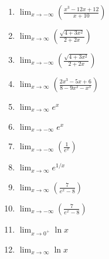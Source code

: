 \documentclass[12pt]{article}
\newif\ifans
\begin{document}
\begin{enumerate}
\item  $\displaystyle \lim_{x\rightarrow -\infty}{\left(\frac{x^3-12x+12}{x+10}\right)}$

\ifans{\fbox{$+\infty$}} \fi

\item $\displaystyle \lim_{x \rightarrow \infty}{\left(\frac{\sqrt{4+3x^2}}{2+2x}\right)}$

\ifans{\fbox{$\displaystyle \frac{\sqrt{3}}{2}$}} \fi

\item $\displaystyle \lim_{x \rightarrow -\infty}{\left(\frac{\sqrt{4+3x^2}}{2+2x}\right)}$

\ifans{\fbox{$\displaystyle -\frac{\sqrt{3}}{2}$}} \fi

\item $\displaystyle \lim_{x \rightarrow \infty}{\left(\frac{2x^3-5x+6}{8-9x^2-x^3}\right)}$

\ifans{\fbox{$-2$}} \fi

\item  $\displaystyle \lim_{x\rightarrow \infty}{e^{x}}$ 

\ifans{\fbox{$+\infty$}} \fi

\item  $\displaystyle \lim_{x\rightarrow -\infty}{e^x}$ 

\ifans{\fbox{0}} \fi

\item  $\displaystyle \lim_{x\rightarrow -\infty}{\left(\frac{1}{e^x}\right)}$ 

\ifans{\fbox{$+\infty$}} \fi

\item  $\displaystyle \lim_{x\rightarrow \infty} e^{1/x}$ 

\ifans{\fbox{1}} \fi

\item $\displaystyle \lim_{x \rightarrow \infty}{\left(\frac{7}{e^x-8}\right)}$

\ifans{\fbox{0}} \fi

\item $\displaystyle \lim_{x \rightarrow -\infty}{\left(\frac{7}{e^x-8}\right)}$

\ifans{\fbox{$\displaystyle -\frac{7}{8}$}} \fi

\item $\displaystyle \lim_{x\rightarrow 0^+}{\ln{x}}$ 

\ifans{\fbox{$-\infty$}} \fi

\item  $\displaystyle \lim_{x\rightarrow \infty}{\ln{x}}$ 


\end{enumerate}
\end{document}
